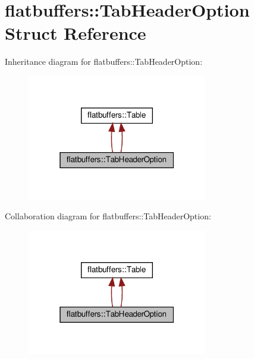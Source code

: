 \hypertarget{structflatbuffers_1_1TabHeaderOption}{}\section{flatbuffers\+:\+:Tab\+Header\+Option Struct Reference}
\label{structflatbuffers_1_1TabHeaderOption}


Inheritance diagram for flatbuffers\+:\+:Tab\+Header\+Option\+:
\nopagebreak
\begin{figure}[H]
\begin{center}
\leavevmode
\includegraphics[width=223pt]{structflatbuffers_1_1TabHeaderOption__inherit__graph}
\end{center}
\end{figure}


Collaboration diagram for flatbuffers\+:\+:Tab\+Header\+Option\+:
\nopagebreak
\begin{figure}[H]
\begin{center}
\leavevmode
\includegraphics[width=223pt]{structflatbuffers_1_1TabHeaderOption__coll__graph}
\end{center}
\end{figure}
